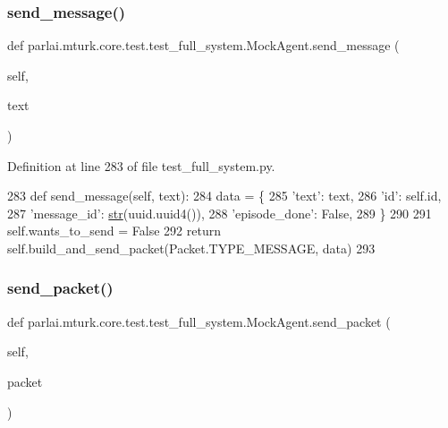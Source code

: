 \subsubsection{\texorpdfstring{send\+\_\+message()}{send\_message()}}
{\footnotesize\ttfamily def parlai.\+mturk.\+core.\+test.\+test\+\_\+full\+\_\+system.\+Mock\+Agent.\+send\+\_\+message (\begin{DoxyParamCaption}\item[{}]{self,  }\item[{}]{text }\end{DoxyParamCaption})}



Definition at line 283 of file test\+\_\+full\+\_\+system.\+py.


\begin{DoxyCode}
283     \textcolor{keyword}{def }send\_message(self, text):
284         data = \{
285             \textcolor{stringliteral}{'text'}: text,
286             \textcolor{stringliteral}{'id'}: self.id,
287             \textcolor{stringliteral}{'message\_id'}: \hyperlink{namespacegenerate__task__READMEs_a5b88452ffb87b78c8c85ececebafc09f}{str}(uuid.uuid4()),
288             \textcolor{stringliteral}{'episode\_done'}: \textcolor{keyword}{False},
289         \}
290 
291         self.wants\_to\_send = \textcolor{keyword}{False}
292         \textcolor{keywordflow}{return} self.build\_and\_send\_packet(Packet.TYPE\_MESSAGE, data)
293 
\end{DoxyCode}
\mbox{\label{classparlai_1_1mturk_1_1core_1_1test_1_1test__full__system_1_1MockAgent_a0a286b82f9e0758cdfabf9b7fb51e6b6}} 
\subsubsection{\texorpdfstring{send\+\_\+packet()}{send\_packet()}}
{\footnotesize\ttfamily def parlai.\+mturk.\+core.\+test.\+test\+\_\+full\+\_\+system.\+Mock\+Agent.\+send\+\_\+packet (\begin{DoxyParamCaption}\item[{}]{self,  }\item[{}]{packet }\end{DoxyParamCaption})}



